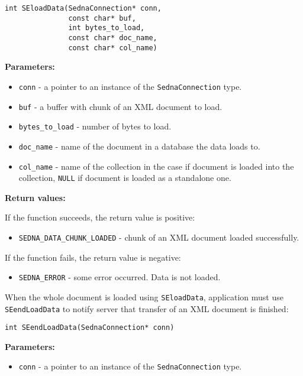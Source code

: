 \documentclass[a4paper,12pt]{article}
\newenvironment{citemize}
{\begin{itemize}
  \setlength{\itemsep}{0pt}
  \setlength{\parskip}{0pt}
  \setlength{\parsep}{0pt}}
{\end{itemize}}
\begin{document}
\begin{verbatim}
int SEloadData(SednaConnection* conn,
               const char* buf,
               int bytes_to_load,
               const char* doc_name,
               const char* col_name)
\end{verbatim}

\noindent
\textbf{Parameters:}

\begin{citemize}
\item\verb!conn! - a pointer to an instance of the \verb!SednaConnection! type.
\item\verb!buf! - a buffer with chunk of an XML document to load.
\item\verb!bytes_to_load! - number of bytes to load.
\item\verb!doc_name! - name of the document in a database the data loads to.
\item\verb!col_name! - name of the collection in the case if document is loaded
into the collection, \verb!NULL! if document is loaded as a standalone one.
\end{citemize}

\noindent
\textbf{Return values:}

\medskip

\noindent
If the function succeeds, the return value is positive:

\begin{citemize}
\item\verb!SEDNA_DATA_CHUNK_LOADED! - chunk of an XML document loaded
successfully.
\end{citemize}

\noindent
If the function fails, the return value is negative:

\begin{citemize}
\item\verb!SEDNA_ERROR! - some error occurred. Data is not loaded.
\end{citemize}

When the whole document is loaded using \verb!SEloadData!, application must use
\verb!SEendLoadData! to notify server that transfer of an XML document is
finished:

\begin{verbatim}
int SEendLoadData(SednaConnection* conn)
\end{verbatim}

\noindent
\textbf{Parameters:}

\begin{citemize}
\item\verb!conn! - a pointer to an instance of the \verb!SednaConnection! type.
\end{citemize}
\end{document}
